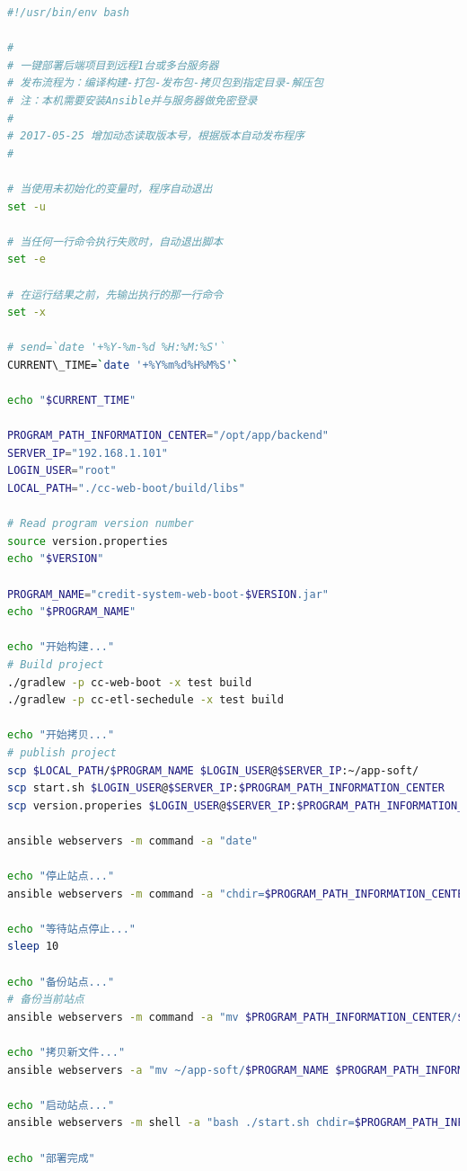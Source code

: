 \documentclass[12pt]{book}
\numberwithin{dummy}{section}
\theoremstyle{ocrenumbox}
\theoremstyle{blacknumex}
\theoremstyle{blacknumbox}
\theoremstyle{ocrenum}
\begin{document}
\begin{lstlisting}[language=Bash]
#!/usr/bin/env bash

#
# 一键部署后端项目到远程1台或多台服务器
# 发布流程为：编译构建-打包-发布包-拷贝包到指定目录-解压包
# 注：本机需要安装Ansible并与服务器做免密登录
#
# 2017-05-25 增加动态读取版本号，根据版本自动发布程序
#

# 当使用未初始化的变量时，程序自动退出
set -u

# 当任何一行命令执行失败时，自动退出脚本
set -e

# 在运行结果之前，先输出执行的那一行命令
set -x

# send=`date '+%Y-%m-%d %H:%M:%S'`
CURRENT\_TIME=`date '+%Y%m%d%H%M%S'`

echo "$CURRENT_TIME"

PROGRAM_PATH_INFORMATION_CENTER="/opt/app/backend"
SERVER_IP="192.168.1.101"
LOGIN_USER="root"
LOCAL_PATH="./cc-web-boot/build/libs"

# Read program version number
source version.properties
echo "$VERSION"

PROGRAM_NAME="credit-system-web-boot-$VERSION.jar"
echo "$PROGRAM_NAME"

echo "开始构建..."
# Build project
./gradlew -p cc-web-boot -x test build
./gradlew -p cc-etl-sechedule -x test build

echo "开始拷贝..."
# publish project
scp $LOCAL_PATH/$PROGRAM_NAME $LOGIN_USER@$SERVER_IP:~/app-soft/
scp start.sh $LOGIN_USER@$SERVER_IP:$PROGRAM_PATH_INFORMATION_CENTER
scp version.properies $LOGIN_USER@$SERVER_IP:$PROGRAM_PATH_INFORMATION_CENTER

ansible webservers -m command -a "date"

echo "停止站点..."
ansible webservers -m command -a "chdir=$PROGRAM_PATH_INFORMATION_CENTER bash ./stop.sh"

echo "等待站点停止..."
sleep 10

echo "备份站点..."
# 备份当前站点
ansible webservers -m command -a "mv $PROGRAM_PATH_INFORMATION_CENTER/$PROGRAM_NAME $PROGRAM_PATH_INFORMATION_CENTER/$PROGRAM_NAME-$CURRENT_TIME"

echo "拷贝新文件..."
ansible webservers -a "mv ~/app-soft/$PROGRAM_NAME $PROGRAM_PATH_INFORMATION_CENTER"

echo "启动站点..."
ansible webservers -m shell -a "bash ./start.sh chdir=$PROGRAM_PATH_INFORMATION_CENTER"

echo "部署完成"
\end{lstlisting}
\end{document}
